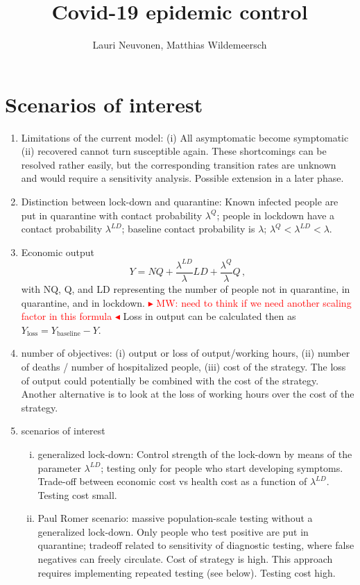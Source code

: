 \documentclass{article}
\title{Covid-19 epidemic control}
\author{Lauri Neuvonen, Matthias Wildemeersch}
\date{}
\newcommand{\be}{\begin{equation}}
\newcommand{\ee}{\end{equation}}
\newcommand{\mynote}[1]{\noindent \textcolor{red} {{$\blacktriangleright$
   \small{\textsf{#1}} $\blacktriangleleft$}}}
\begin{document}
\maketitle
\section{Scenarios of interest}
\begin{enumerate}[-]
\item Limitations of the current model: (i) All asymptomatic become symptomatic (ii) recovered cannot turn susceptible again. These shortcomings can be resolved rather easily, but the corresponding transition rates are unknown and would require a sensitivity analysis. Possible extension in a later phase. 
\item Distinction between lock-down and quarantine: Known infected people are put in quarantine with contact probability $\lambda^Q$; people in lockdown have a contact probability $\lambda^{LD}$; baseline contact probability is $\lambda$; $\lambda^Q < \lambda^{LD}<\lambda$.
\item Economic output
\be
Y = NQ + \frac{\lambda^{LD}}{\lambda} LD + \frac{\lambda^Q}{\lambda} Q \, ,
\ee
with NQ, Q, and LD representing the number of people not in quarantine, in quarantine, and in lockdown. 
\mynote{MW: need to think if we need another scaling factor in this formula} Loss in output can be calculated then as $Y_\mathrm{loss} = Y_\mathrm{baseline} - Y$. 
\item number of objectives: (i) output or loss of output/working hours, (ii) number of deaths / number of hospitalized people, (iii) cost of the strategy. The loss of output could potentially be combined with the cost of the strategy. Another alternative is to look at the loss of working hours over the cost of the strategy. 
\item scenarios of interest
\begin{enumerate}[i.]
\item generalized lock-down: Control strength of the lock-down by means of the parameter $\lambda^{LD}$; testing only for people who start developing symptoms. Trade-off between economic cost vs health cost as a function of $\lambda^{LD}$. Testing cost small. 
\item Paul Romer scenario: massive population-scale testing without a generalized lock-down. Only people who test positive are put in quarantine; tradeoff related to sensitivity of diagnostic testing, where false negatives can freely circulate. Cost of strategy is high. This approach requires implementing repeated testing (see below). Testing cost high. 

\end{enumerate}
\end{enumerate}
\end{document}

